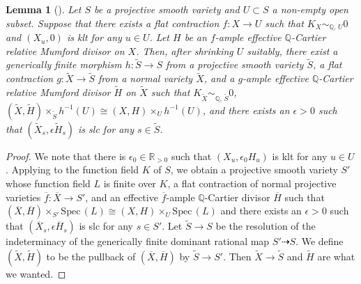 \documentclass[12pt,twoside]{amsart}
\newtheorem{lem}[thm]{Lemma}
\theoremstyle{definition}
\begin{document}
\begin{lem}[{\cite[Lemma 7]{KX}}]\label{lem--kollar-xu}
Let $S$ be a projective smooth variety and $U\subset S$ a non-empty open subset.
Suppose that there exists a flat contraction $f\colon X\to U$ such that $K_X\sim_{\mathbb{Q},\,U}0$ and $(X_u,0)$ is klt for any $u\in U$. 
Let $H$ be an $f$-ample effective $\mathbb{Q}$-Cartier relative Mumford divisor on $X$.
Then, after shrinking $U$ suitably, there exist a generically finite morphism $h\colon \tilde{S}\to S$ from a projective smooth variety $\tilde{S}$, a flat contraction $g\colon \tilde{X}\to \tilde{S}$ from a normal variety $\tilde{X}$, and a $g$-ample effective $\mathbb{Q}$-Cartier relative Mumford divisor $\tilde{H}$ on $\tilde{X}$ such that $K_{\tilde{X}}\sim_{\mathbb{Q},\,\tilde{S}}0$, $(\tilde{X},\tilde{H})\times_{\tilde{S}}h^{-1}(U)\cong(X,H)\times_Uh^{-1}(U)$, and there exists an $\epsilon>0$ such that $(\tilde{X}_s,\epsilon\tilde{H}_s)$ is slc for any $s\in \tilde{S}$.
\end{lem}

\begin{proof}
We note that there is $\epsilon_{0} \in \mathbb{R}_{>0}$ such that $(X_u,\epsilon_{0} H_u)$ is klt for any $u\in U$. 
Applying \cite[Lemma 7]{KX} to the function field $K$ of $S$, we obtain a projective smooth variety $S'$ whose function field $L$ is finite over $K$, a flat contraction of normal projective varieties $\overline{f}\colon \overline{X}\to S'$, and an effective $\overline{f}$-ample $\mathbb{Q}$-Cartier divisor $\overline{H}$ such that $(\overline{X},\overline{H})\times_{S'}\mathrm{Spec}\,(L)\cong (X,H)\times_{U}\mathrm{Spec}\,(L)$ and there exists an $\epsilon>0$ such that $(\overline{X}_s,\epsilon\overline{H}_s)$ is slc for any $s\in S'$. 
Let $\tilde{S} \to S$ be the resolution of the indeterminacy of the generically finite dominant rational map $S'\dashrightarrow S$. 
We define $(\tilde{X}, \tilde{H})$ to be the pullback of $(\overline{X},\overline{H})$ by $\tilde{S} \to S'$. 
Then $\tilde{X}\to \tilde{S}$ and $\tilde{H}$ are what we wanted. 
\end{proof}
\end{document}
